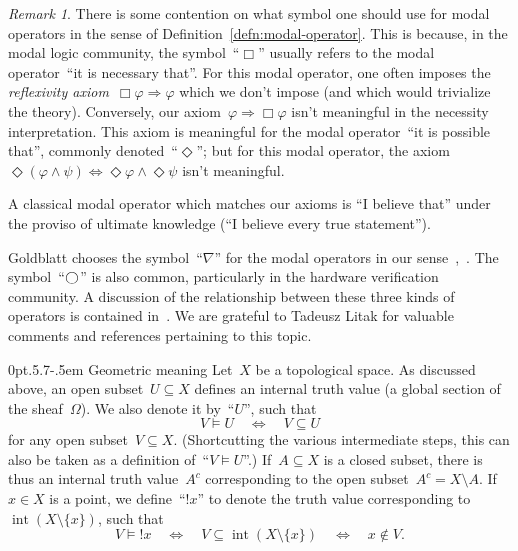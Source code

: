 \documentclass[10pt,reqno,a4paper]{amsbook}
\makeatletter
\theoremstyle{definition}
\theoremstyle{plain}
\theoremstyle{remark}
\newtheorem{rem}[defn]{Remark}
\DeclareMathOperator{\Int}{int}
\newcommand{\?}{\,{:}\,}
\renewcommand{\_}{\mathpunct{.}\,}
\newcommand{\notat}[1]{{!#1}}
\def\subsection{\@startsection{subsection}{2}%
  {0pt}{.5\linespacing\@plus.7\linespacing}{-.5em}%
  {\normalfont\bfseries}}
\makeatother
\begin{document}
\begin{rem}There is some contention on what symbol one should use for modal
operators in the sense of Definition~\ref{defn:modal-operator}. This is
because, in the modal logic community, the symbol~``$\Box$'' usually refers to
the modal operator~``it is necessary that''. For this modal operator, one often
imposes the \emph{reflexivity axiom}~$\Box\varphi \Rightarrow \varphi$ which we
don't impose (and which would trivialize the theory). Conversely, our
axiom~$\varphi \Rightarrow \Box\varphi$ isn't meaningful in the necessity
interpretation. This axiom is meaningful for the modal operator~``it is
possible that'', commonly denoted~``$\Diamond$''; but for this modal operator, the
axiom~$\Diamond(\varphi \wedge \psi) \Leftrightarrow \Diamond\varphi \wedge
\Diamond\psi$ isn't meaningful.

A classical modal operator which matches our axioms is ``I believe that''
under the proviso of ultimate knowledge (``I believe every true
statement'').

Goldblatt chooses the symbol~``$\nabla$'' for the modal operators in our
sense~\cite[Section~14.5]{goldblatt:topoi},~\cite{goldblatt:modality}. The
symbol~``$\varbigcirc$'' is also common, particularly in the hardware
verification community. A discussion of the relationship between these three
kinds of operators is contained in~\cite{pfenning:davies:reconstruction}. We
are grateful to Tadeusz Litak for valuable comments and references pertaining
to this topic.
\end{rem}


\subsection{Geometric meaning}\label{sect:modalities-geometric-meaning}
Let~$X$ be a topological space. As discussed
above, an open subset~$U \subseteq X$ defines an internal truth value (a global
section of the sheaf~$\Omega$). We also denote it by~``$U$'', such that
\[ V \models U \quad\Longleftrightarrow\quad V \subseteq U \]
for any open subset~$V \subseteq X$. (Shortcutting the various intermediate
steps, this can also be taken as a definition of~``$V \models U$''.)
If~$A \subseteq X$ is a closed subset, there is thus an internal truth
value~$A^c$ corresponding to the open subset~$A^c = X \setminus A$. If~$x \in
X$ is a point, we define~``$\notat{x}$'' to denote the truth value
corresponding to~$\Int(X \setminus \{x\})$, such that
\[ V \models \notat{x} \quad\Longleftrightarrow\quad V \subseteq \Int(X
\setminus \{ x \}) \quad\Longleftrightarrow\quad x \not\in V. \]
\end{document}
